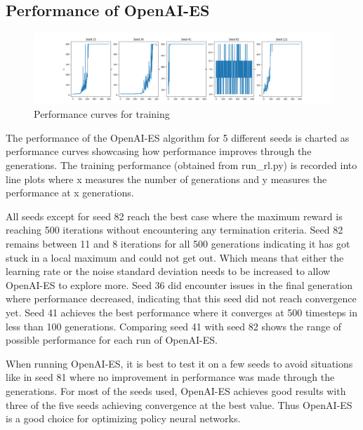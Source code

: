\documentclass{article}
\begin{document}
\subsection*{Performance of OpenAI-ES}
\begin{figure}[h!]
	\includegraphics[width=\linewidth]{train_performance.png}
	\caption{Performance curves for training}
\end{figure}
\noindent The performance of the OpenAI-ES algorithm for 5 different seeds is charted as performance curves showcasing how performance improves through the generations. The training performance (obtained from run\_rl.py) is recorded into line plots where x measures the number of generations and y measures the performance at x generations. \par
\noindent All seeds except for seed 82 reach the best case where the maximum reward is reaching 500 iterations without encountering any termination criteria. Seed 82 remains between 11 and 8 iterations for all 500 generations indicating it has got stuck in a local maximum and could not get out. Which means that either the learning rate or the noise standard deviation needs to be increased to allow OpenAI-ES to explore more. Seed 36 did encounter issues in the final generation where performance decreased, indicating that this seed did not reach convergence yet. Seed 41 achieves the best performance where it converges at 500 timesteps in less than 100 generations. Comparing seed 41 with seed 82 shows the range of possible performance for each run of OpenAI-ES. \par
\noindent When running OpenAI-ES, it is best to test it on a few seeds to avoid situations like in seed 81 where no improvement in performance was made through the generations. For most of the seeds used, OpenAI-ES achieves good results with three of the five seeds achieving convergence at the best value. Thus OpenAI-ES is a good choice for optimizing policy neural networks.  \par


\end{document}
